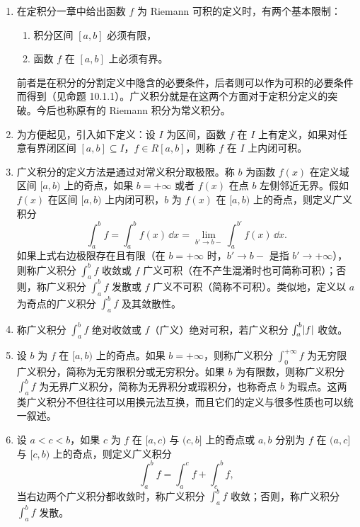 \begin{enumerate}
  \item 在定积分一章中给出函数 $f$ 为 Riemann 可积的定义时，有两个基本限制：
  \begin{enumerate}[label=(\arabic*)]
    \item 积分区间 $[a,b]$ 必须有限，
    \item 函数 $f$ 在 $[a,b]$ 上必须有界。
  \end{enumerate}
  前者是在积分的分割定义中隐含的必要条件，后者则可以作为可积的必要条件而得到（见命题 10.1.1）。广义积分就是在这两个方面对于定积分定义的突破。今后也称原有的 Riemann 积分为常义积分。

  \item 为方便起见，引入如下定义：设 $I$ 为区间，函数 $f$ 在 $I$ 上有定义，如果对任意有界闭区间 $[a,b]\subseteq I$，$f\in R[a,b]$，则称 $f$ 在 $I$ 上内闭可积。

  \item 广义积分的定义方法是通过对常义积分取极限。称 $b$ 为函数 $f(x)$ 在定义域区间 $[a,b)$ 上的奇点，如果 $b=+\infty$ 或者 $f(x)$ 在点 $b$ 左侧邻近无界。假如 $f(x)$ 在区间 $[a,b)$ 上内闭可积，$b$ 为 $f(x)$ 在 $[a,b)$ 上的奇点，则定义广义积分
  \[
    \int_a^b f=\int_a^b f(x)\,\dd x=\lim_{b'\to b-}\int_a^{b'}f(x)\,\dd x.
  \]
  如果上式右边极限存在且有限（在 $b=+\infty$ 时，$b'\to b-$ 是指 $b'\to+\infty$），则称广义积分 $\int_a^b f$ 收敛或 $f$ 广义可积（在不产生混淆时也可简称可积）；否则，称广义积分 $\int_a^b f$ 发散或 $f$ 广义不可积（简称不可积）。类似地，定义以 $a$ 为奇点的广义积分 $\int_a^b f$ 及其敛散性。

  \item 称广义积分 $\int_a^b f$ 绝对收敛或 $f$（广义）绝对可积，若广义积分 $\int_a^b\lvert f\rvert$ 收敛。

  \item 设 $b$ 为 $f$ 在 $[a,b)$ 上的奇点。如果 $b=+\infty$，则称广义积分 $\int_0^{+\infty}f$ 为无穷限广义积分，简称为无穷限积分或无穷积分。如果 $b$ 为有限数，则称广义积分 $\int_a^b f$ 为无界广义积分，简称为无界积分或瑕积分，也称奇点 $b$ 为瑕点。这两类广义积分不但往往可以用换元法互换，而且它们的定义与很多性质也可以统一叙述。

  \item 设 $a<c<b$，如果 $c$ 为 $f$ 在 $[a,c)$ 与 $(c,b]$ 上的奇点或 $a,b$ 分别为 $f$ 在 $(a,c]$ 与 $[c,b)$ 上的奇点，则定义广义积分
  \[
    \int_a^b f=\int_a^c f+\int_c^b f,
  \]
  当右边两个广义积分都收敛时，称广义积分 $\int_a^b f$ 收敛；否则，称广义积分 $\int_a^b f$ 发散。
\end{enumerate}

